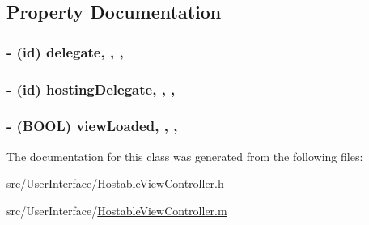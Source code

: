 \subsection{Property Documentation}
\hypertarget{interface_hostable_view_controller_a8d9332fcd23523b1e2520b8765577423}{
\subsubsection[{delegate}]{\setlength{\rightskip}{0pt plus 5cm}-\/ (id) delegate\hspace{0.3cm}{\ttfamily [read]}, {\ttfamily [write]}, {\ttfamily [atomic]}, {\ttfamily [assign]}}}\label{interface_hostable_view_controller_a8d9332fcd23523b1e2520b8765577423}
\hypertarget{interface_hostable_view_controller_a4b4c555a8e2787aa3a2d784b2e449552}{
\subsubsection[{hosting\-Delegate}]{\setlength{\rightskip}{0pt plus 5cm}-\/ (id) hosting\-Delegate\hspace{0.3cm}{\ttfamily [read]}, {\ttfamily [write]}, {\ttfamily [atomic]}, {\ttfamily [assign]}}}\label{interface_hostable_view_controller_a4b4c555a8e2787aa3a2d784b2e449552}
\hypertarget{interface_hostable_view_controller_ae23af126b4da27e312cebe7b026b5284}{
\subsubsection[{view\-Loaded}]{\setlength{\rightskip}{0pt plus 5cm}-\/ (B\-O\-O\-L) view\-Loaded\hspace{0.3cm}{\ttfamily [read]}, {\ttfamily [write]}, {\ttfamily [atomic]}, {\ttfamily [assign]}}}\label{interface_hostable_view_controller_ae23af126b4da27e312cebe7b026b5284}


The documentation for this class was generated from the following files\-:\begin{DoxyCompactItemize}
\item 
src/\-User\-Interface/\hyperlink{_hostable_view_controller_8h}{Hostable\-View\-Controller.\-h}\item 
src/\-User\-Interface/\hyperlink{_hostable_view_controller_8m}{Hostable\-View\-Controller.\-m}\end{DoxyCompactItemize}
